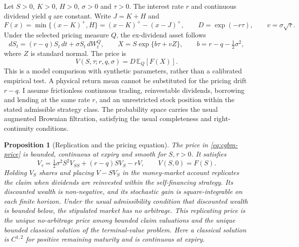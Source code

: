 \documentclass[11pt]{article}
\newtheorem{proposition}[theorem]{Proposition}
\begin{document}
Let $S>0$, $K>0$, $H>0$, $\sigma>0$ and $\tau>0$. The interest rate $r$ and
continuous dividend yield $q$ are constant. Write $J=K+H$ and
\begin{equation}
 F(x)=\min\{(x-K)^+,H\}=(x-K)^+-(x-J)^+,
 \qquad D=\exp(-r\tau),\qquad v=\sigma\sqrt{\tau}.
 \label{eq:cgbm-payoff}
\end{equation}
Under the selected pricing measure $Q$, the ex-dividend asset follows
\begin{equation}
 dS_t=(r-q)S_t\,dt+\sigma S_t\,dW_t^Q,
 \qquad
 X=S\exp\{b\tau+vZ\},
 \qquad b=r-q-\tfrac12\sigma^2,
 \label{eq:cgbm-law}
\end{equation}
where $Z$ is standard normal. The price is
\begin{equation}
 V(S,\tau;r,q,\sigma)=D\,\mathbb E_Q[F(X)].
 \label{eq:cgbm-price}
\end{equation}
This is a model comparison with synthetic parameters, rather than a
calibrated empirical test. A physical return mean cannot be substituted
for the pricing drift $r-q$.
I assume frictionless continuous trading, reinvestable dividends,
borrowing and lending at the same rate $r$, and an unrestricted stock
position within the stated admissible strategy class. The probability
space carries the usual augmented Brownian filtration, satisfying the
usual completeness and right-continuity conditions.

\begin{proposition}[Replication and the pricing equation]
\label{prop:cgbm-replication}
The price in \eqref{eq:cgbm-price} is bounded, continuous at expiry and smooth
for $S,\tau>0$. It satisfies
\begin{equation}
 V_\tau=\tfrac12\sigma^2S^2V_{SS}+(r-q)SV_S-rV,
 \qquad V(S,0)=F(S).
 \label{eq:cgbm-pde}
\end{equation}
Holding $V_S$ shares and placing $V-SV_S$ in the money-market account
replicates the claim when dividends are reinvested within the
self-financing strategy. Its discounted wealth is non-negative, and its
stochastic gain is square-integrable on each finite horizon. Under the
usual admissibility condition that discounted wealth is bounded below,
the stipulated market has no arbitrage. This replicating price is the
unique no-arbitrage price among bounded claim valuations and the unique
bounded classical solution of the terminal-value problem. Here a classical
solution is $C^{1,2}$ for positive remaining maturity and is continuous
at expiry.
\end{proposition}
\end{document}
